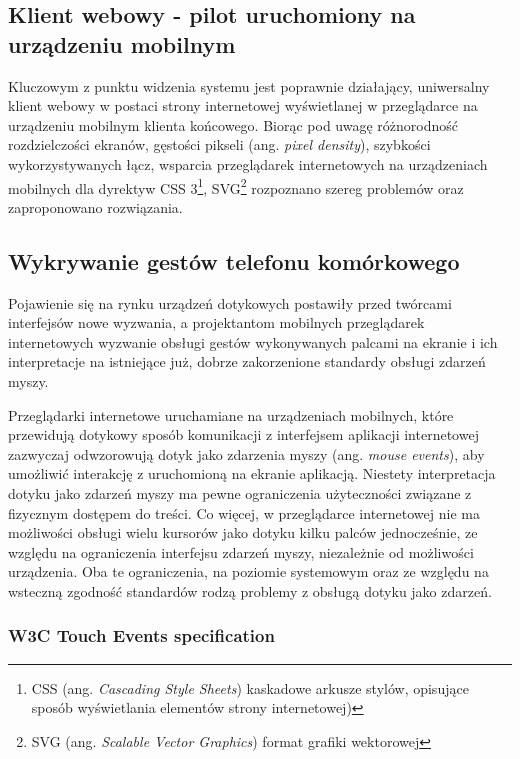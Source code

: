 \subsection{Klient webowy - pilot uruchomiony na urządzeniu mobilnym}

Kluczowym z punktu widzenia systemu jest poprawnie działający, uniwersalny klient webowy w postaci strony internetowej wyświetlanej w przeglądarce na urządzeniu mobilnym klienta końcowego. Biorąc pod uwagę różnorodność rozdzielczości ekranów, gęstości pikseli (ang. \emph{pixel density}), szybkości wykorzystywanych łącz, wsparcia przeglądarek internetowych na urządzeniach mobilnych dla dyrektyw CSS 3\footnote{CSS (ang. \emph{Cascading Style Sheets}) kaskadowe arkusze stylów, opisujące sposób wyświetlania elementów strony internetowej)}, SVG\footnote{SVG (ang. \emph{Scalable Vector Graphics}) format grafiki wektorowej} rozpoznano szereg problemów oraz zaproponowano rozwiązania.

\subsection{Wykrywanie gestów telefonu komórkowego}
\label{sub:touch-detection}

Pojawienie się na rynku urządzeń dotykowych postawiły przed twórcami interfejsów nowe wyzwania, a projektantom mobilnych przeglądarek internetowych wyzwanie obsługi gestów wykonywanych palcami na ekranie i ich interpretacje na istniejące już, dobrze zakorzenione standardy obsługi zdarzeń myszy.

Przeglądarki internetowe uruchamiane na urządzeniach mobilnych, które przewidują dotykowy sposób komunikacji z interfejsem aplikacji internetowej zazwyczaj odwzorowują dotyk jako zdarzenia myszy (ang. \emph{mouse events}), aby umożliwić interakcję z uruchomioną na ekranie aplikacją. Niestety interpretacja dotyku jako zdarzeń myszy ma pewne ograniczenia użyteczności związane z fizycznym dostępem do treści. Co więcej, w przeglądarce internetowej nie ma możliwości obsługi wielu kursorów jako dotyku kilku palców jednocześnie, ze względu na ograniczenia interfejsu zdarzeń myszy, niezależnie od możliwości urządzenia. Oba te ograniczenia, na poziomie systemowym oraz ze względu na wsteczną zgodność standardów rodzą problemy z obsługą dotyku jako zdarzeń.

\subsubsection{W3C Touch Events specification}

